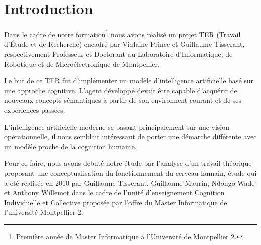 \chapter*{Introduction}
Dans le cadre de notre formation\footnote{Première année de Master Informatique à l'Université de Montpellier 2.} nous avons réalisé un projet TER (Travail d'Étude et de Recherche) encadré par \mbox{Violaine} \mbox{Prince} et \mbox{Guillaume} \mbox{Tisserant}, respectivement Professeur et Doctorant au Laboratoire d'Informatique, de Robotique et de Microélectronique de Montpellier.

Le but de ce TER fut d'implémenter un modèle d'intelligence artificielle basé sur une approche cognitive. L'agent développé devait être capable d'acquérir de nouveaux concepts sémantiques à partir de son environnent courant et de ses expériences passées.

L'intelligence artificielle moderne se basant principalement sur une vision opérationnelle, il nous semblait intéressant de porter une démarche différente avec un modèle proche de la cognition humaine.

Pour ce faire, nous avons débuté notre étude par l'analyse d'un travail théorique proposant une conceptualisation du fonctionnement du cerveau humain, étude qui a été réalisée en 2010 par \mbox{Guillaume} \mbox{Tisserant}, \mbox{Guillaume} \mbox{Maurin}, \mbox{Ndongo} \mbox{Wade} et \mbox{Anthony} \mbox{Willemot} dans le cadre de l'unité d'enseignement \og Cognition Individuelle et Collective\fg{} proposée par l'offre du Master Informatique de l'université Montpellier 2.
